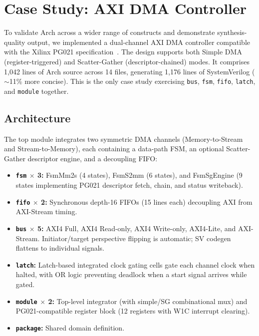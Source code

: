 \documentclass[11pt,twocolumn]{article}
\begin{document}
\section{Case Study: AXI DMA Controller}\label{sec:axidma}

To validate Arch across a wider range of constructs and demonstrate synthesis-quality output, we implemented a dual-channel AXI DMA controller compatible with the Xilinx PG021 specification~\cite{pg021}. The design supports both Simple DMA (register-triggered) and Scatter-Gather (descriptor-chained) modes. It comprises 1,042 lines of Arch source across 14 files, generating 1,176 lines of SystemVerilog (${\sim}$11\% more concise). This is the only case study exercising \texttt{bus}, \texttt{fsm}, \texttt{fifo}, \texttt{latch}, and \texttt{module} together.

\subsection{Architecture}

The top module integrates two symmetric DMA channels (Memory-to-Stream and Stream-to-Memory), each containing a data-path FSM, an optional Scatter-Gather descriptor engine, and a decoupling FIFO:

\begin{itemize}
\item \textbf{\texttt{fsm} $\times$ 3:} FsmMm2s (4 states), FsmS2mm (6 states), and FsmSgEngine (9 states implementing PG021 descriptor fetch, chain, and status writeback).
\item \textbf{\texttt{fifo} $\times$ 2:} Synchronous depth-16 FIFOs (15 lines each) decoupling AXI from AXI-Stream timing.
\item \textbf{\texttt{bus} $\times$ 5:} AXI4 Full, AXI4 Read-only, AXI4 Write-only, AXI4-Lite, and AXI-Stream. Initiator/target perspective flipping is automatic; SV codegen flattens to individual signals.
\item \textbf{\texttt{latch}:} Latch-based integrated clock gating cells gate each channel clock when halted, with OR logic preventing deadlock when a start signal arrives while gated.
\item \textbf{\texttt{module} $\times$ 2:} Top-level integrator (with simple/SG combinational mux) and PG021-compatible register block (12 registers with W1C interrupt clearing).
\item \textbf{\texttt{package}:} Shared domain definition.
\end{itemize}
\end{document}
